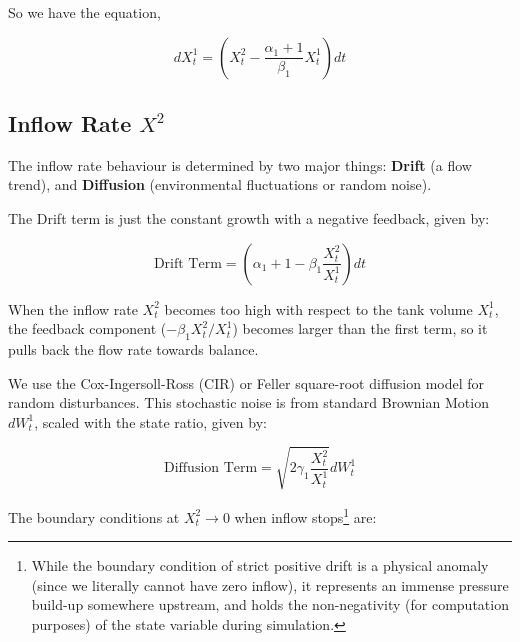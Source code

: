 \documentclass[conference]{IEEEtran}
\renewcommand{\medskip}{\vspace{1\baselineskip}}
\renewcommand{\smallskip}{\vspace{0.5\baselineskip}}
\theoremstyle{definitionsc}
\theoremstyle{plainsc}
\theoremstyle{remarksc}
\begin{document}
So we have the equation,

\begin{equation}
\label{eq:Xt1}
	dX_t^1 = \left(X_t^2 - \frac{\alpha_1 + 1}{\beta_1} X_t^1\right)dt
\end{equation}



\medskip







\subsection{\textbf{Inflow Rate $X^2$}}

The inflow rate behaviour is determined by two major things: \textbf{Drift} (a flow trend), and \textbf{Diffusion} (environmental fluctuations or random noise).

The Drift term is just the constant growth with a negative feedback, given by:

\begin{equation*}
	\text{Drift Term}=\left(\alpha _{1}+1-\beta _{1}\frac{X_{t}^{2}}{X_{t}^{1}}\right)dt
\end{equation*}

\smallskip

When the inflow rate $X_t^2$ becomes too high with respect to the tank volume $X_t^1$, the feedback component ($-\beta_1 {X_t^2}/{X_t^1}$)  becomes larger than the first term, so it pulls back the flow rate towards balance.

\smallskip

We use the Cox-Ingersoll-Ross (CIR) or Feller square-root diffusion model \cite{wfeller} for random disturbances. This stochastic noise is from standard Brownian Motion $dW_t^1$, scaled with the state ratio, given by:

\begin{equation*}
	\text{Diffusion Term}=\sqrt{2\gamma _{1}\frac{X_{t}^{2}}{X_{t}^{1}}}dW_{t}^{1}
\end{equation*}

\smallskip

The boundary conditions at $X_t^2 \to 0$ when inflow stops\footnote{While the boundary condition of strict positive drift is a physical anomaly (since we literally cannot have zero inflow), it represents an immense pressure build-up somewhere upstream, and holds the non-negativity (for computation purposes) of the state variable during simulation.} are:
\end{document}
